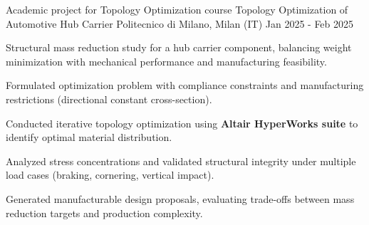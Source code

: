 
\cventry
{Academic project for Topology Optimization course}
{Topology Optimization of Automotive Hub Carrier}
{Politecnico di Milano, Milan (IT)}
{Jan 2025 - Feb 2025}
{
    Structural mass reduction study for a hub carrier component, balancing weight minimization with mechanical performance and manufacturing feasibility.
    \newline
    \vspace{4mm}
    \begin{cvitems}
        \item {Formulated optimization problem with compliance constraints and manufacturing restrictions (directional constant cross-section).}
        \item {Conducted iterative topology optimization using \textbf{Altair HyperWorks suite} to identify optimal material distribution.}
        \item {Analyzed stress concentrations and validated structural integrity under multiple load cases (braking, cornering, vertical impact).}
        \item {Generated manufacturable design proposals, evaluating trade-offs between mass reduction targets and production complexity.}
    \end{cvitems}
}
